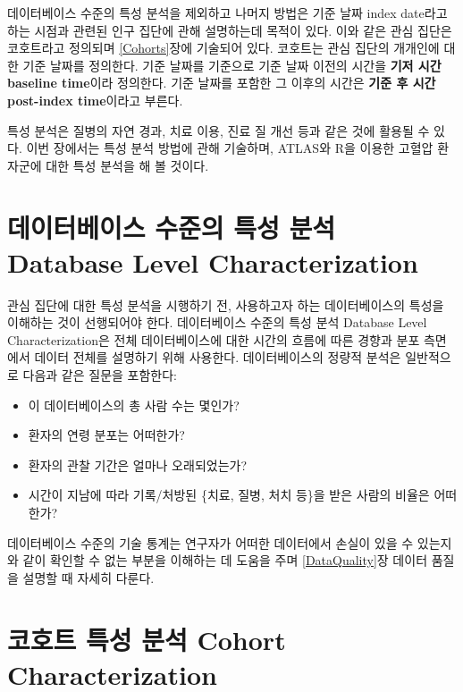 \documentclass[10.5pt]{book}
\providecommand{\tightlist}{%
  \setlength{\itemsep}{0pt}\setlength{\parskip}{0pt}}
\theoremstyle{definition}
\theoremstyle{definition}
\theoremstyle{definition}
\theoremstyle{remark}
\begin{document}
데이터베이스 수준의 특성 분석을 제외하고 나머지 방법은 기준 날짜 index
date라고 하는 시점과 관련된 인구 집단에 관해 설명하는데 목적이 있다.
이와 같은 관심 집단은 코호트라고 정의되며 \ref{Cohorts}장에 기술되어
있다. 코호트는 관심 집단의 개개인에 대한 기준 날짜를 정의한다. 기준
날짜를 기준으로 기준 날짜 이전의 시간을 \textbf{기저 시간 baseline
time}이라 정의한다. 기준 날짜를 포함한 그 이후의 시간은 \textbf{기준 후
시간 post-index time}이라고 부른다.

특성 분석은 질병의 자연 경과, 치료 이용, 진료 질 개선 등과 같은 것에
활용될 수 있다. 이번 장에서는 특성 분석 방법에 관해 기술하며, ATLAS와
R을 이용한 고혈압 환자군에 대한 특성 분석을 해 볼
것이다.
  

\section{데이터베이스 수준의 특성 분석 Database Level
Characterization}\label{----database-level-characterization}

관심 집단에 대한 특성 분석을 시행하기 전, 사용하고자 하는 데이터베이스의
특성을 이해하는 것이 선행되어야 한다. 데이터베이스 수준의 특성 분석
Database Level Characterization은 전체 데이터베이스에 대한 시간의 흐름에
따른 경향과 분포 측면에서 데이터 전체를 설명하기 위해 사용한다.
데이터베이스의 정량적 분석은 일반적으로 다음과 같은 질문을 포함한다:

\begin{itemize}
\tightlist
\item
  이 데이터베이스의 총 사람 수는 몇인가?
\item
  환자의 연령 분포는 어떠한가?
\item
  환자의 관찰 기간은 얼마나 오래되었는가?
\item
  시간이 지남에 따라 기록/처방된 \{치료, 질병, 처치 등\}을 받은 사람의
  비율은 어떠한가?
\end{itemize}

데이터베이스 수준의 기술 통계는 연구자가 어떠한 데이터에서 손실이 있을
수 있는지와 같이 확인할 수 없는 부분을 이해하는 데 도움을 주며
\ref{DataQuality}장 데이터 품질을 설명할 때 자세히 다룬다.

\section{코호트 특성 분석 Cohort
Characterization}\label{---cohort-characterization}
\end{document}
